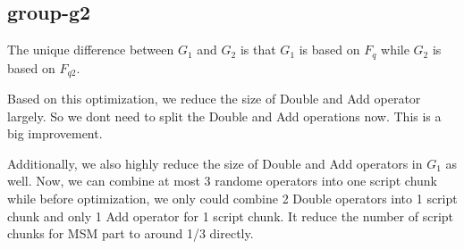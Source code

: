 \subsection{group-g2}

The unique difference between $G_1$ and $G_2$ is that $G_1$ is based on $F_q$ while $G_2$ is based on $F_{q2}$.

Based on this optimization, we reduce the size of Double and Add operator largely. So we dont need to split the Double and 
Add operations now. This is a big improvement.

Additionally, we also highly reduce the size of Double and Add operators in $G_1$ as well. Now, we can combine at most 3 randome operators
into one script chunk while before optimization, we only could combine 2 Double operators into 1 script chunk and only 1 Add operator for 1
script chunk. It reduce the number of script chunks for MSM part to around 1/3 directly. 